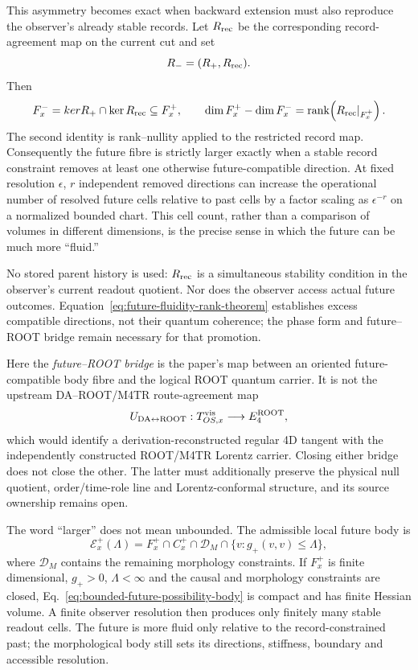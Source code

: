 \documentclass[11pt]{article}
\begin{document}
This asymmetry becomes exact when backward extension must also reproduce the
observer's already stable records. Let $R_{\rm rec}$ be the corresponding
record-agreement map on the current cut and set
\begin{equation}
 R_-=(R_+,R_{\rm rec}).
 \label{eq:record-conditioned-restriction}
\end{equation}
Then
\begin{equation}
 F_x^-=ker R_+\cap\ker R_{\rm rec}\subseteq F_x^+,
 \qquad
 \dim F_x^+-\dim F_x^-
 =\operatorname{rank}\!\left(R_{\rm rec}|_{F_x^+}\right).
 \label{eq:future-fluidity-rank-theorem}
\end{equation}
The second identity is rank--nullity applied to the restricted record map.
Consequently the future fibre is strictly larger exactly when a stable record
constraint removes at least one otherwise future-compatible direction. At
fixed resolution $\epsilon$, $r$ independent removed directions can increase
the operational number of resolved future cells relative to past cells by a
factor scaling as $\epsilon^{-r}$ on a normalized bounded chart. This cell
count, rather than a comparison of volumes in different dimensions, is the
precise sense in which the future can be much more ``fluid.''

No stored parent history is used: $R_{\rm rec}$ is a simultaneous stability
condition in the observer's current readout quotient. Nor does the observer
access actual future outcomes. Equation~\eqref{eq:future-fluidity-rank-theorem}
establishes excess compatible directions, not their quantum coherence; the
phase form and future--ROOT bridge remain necessary for that promotion.

Here the \emph{future--ROOT bridge} is the paper's map between an oriented
future-compatible body fibre and the logical ROOT quantum carrier.  It is not
the upstream DA--ROOT/M4TR route-agreement map
\[
 U_{\rm DA\leftrightarrow ROOT}:
 T^{\rm vis}_{OS,x}\longrightarrow E^{\rm ROOT}_4,
\]
which would identify a derivation-reconstructed regular 4D tangent with the
independently constructed ROOT/M4TR Lorentz carrier.  Closing either bridge
does not close the other.  The latter must additionally preserve the physical
null quotient, order/time-role line and Lorentz-conformal structure, and its
source ownership remains open.

The word ``larger'' does not mean unbounded. The admissible local future body
is
\begin{equation}
 \mathcal E_x^+(\Lambda)
 =F_x^+\cap C_x^+\cap\mathcal D_M
  \cap\{v:g_+(v,v)\leq\Lambda\},
 \label{eq:bounded-future-possibility-body}
\end{equation}
where $\mathcal D_M$ contains the remaining morphology constraints. If
$F_x^+$ is finite dimensional, $g_+>0$, $\Lambda<\infty$ and the causal and
morphology constraints are closed, Eq.~\eqref{eq:bounded-future-possibility-body}
is compact and has finite Hessian volume. A finite observer resolution then
produces only finitely many stable readout cells. The future is more fluid
only relative to the record-constrained past; the morphological body still
sets its directions, stiffness, boundary and accessible resolution.
\end{document}
